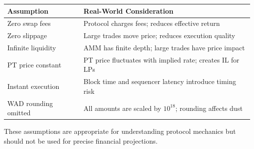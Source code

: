 \begin{center}
\begin{tabular}{l l}
\toprule
\textbf{Assumption} & \textbf{Real-World Consideration} \\
\midrule
Zero swap fees & Protocol charges fees; reduces effective return \\
Zero slippage & Large trades move price; reduces execution quality \\
Infinite liquidity & AMM has finite depth; large trades have price impact \\
PT price constant & PT price fluctuates with implied rate; creates IL for LPs \\
Instant execution & Block time and sequencer latency introduce timing risk \\
WAD rounding omitted & All amounts are scaled by $10^{18}$; rounding affects dust \\
\bottomrule
\end{tabular}
\end{center}

These assumptions are appropriate for understanding protocol mechanics but should not be used for precise financial projections.

